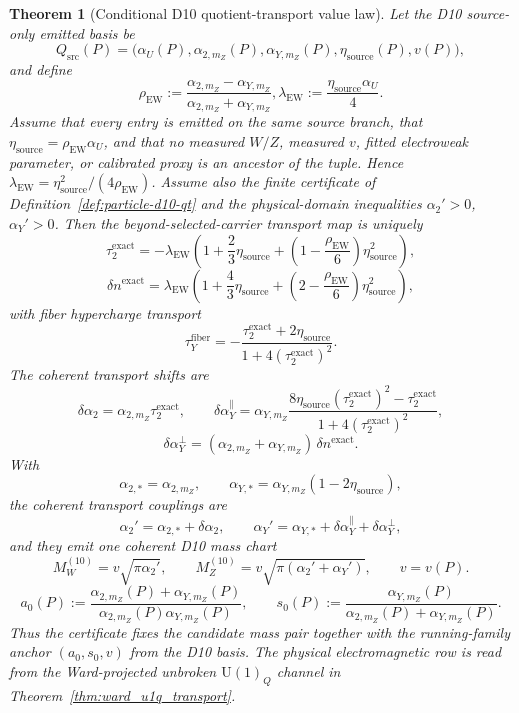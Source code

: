 \documentclass[11pt]{article}
\newtheorem{theorem}{Theorem}[section]
\newcommand{\U}{\mathrm{U}}
\begin{document}
\begin{theorem}[Conditional D10 quotient-transport value law]\label{thm:particle-conditional-d10-qt}
Let the D10 source-only emitted basis be
\[
Q_{\mathrm{src}}(P)=
\bigl(\alpha_U(P),\alpha_{2,m_Z}(P),\alpha_{Y,m_Z}(P),
\eta_{\mathrm{source}}(P),v(P)\bigr),
\]
and define
\[
\rho_{\mathrm{EW}}
:=
\frac{\alpha_{2,m_Z}-\alpha_{Y,m_Z}}{\alpha_{2,m_Z}+\alpha_{Y,m_Z}},
\lambda_{\mathrm{EW}}
:=
\frac{\eta_{\mathrm{source}}\alpha_U}{4}.
\]
Assume that every entry is emitted on the same source branch, that
\(\eta_{\mathrm{source}}=\rho_{\mathrm{EW}}\alpha_U\), and that no measured
\(W/Z\), measured \(v\), fitted electroweak parameter, or calibrated proxy is
an ancestor of the tuple.  Hence
\(\lambda_{\mathrm{EW}}=\eta_{\mathrm{source}}^2/(4\rho_{\mathrm{EW}})\).
Assume also the finite certificate of Definition~\ref{def:particle-d10-qt} and the
physical-domain inequalities
\(\alpha_2'>0\), \(\alpha_Y'>0\).
Then the beyond-selected-carrier transport map is uniquely
\[
\tau_2^{\mathrm{exact}}
=
-\lambda_{\mathrm{EW}}
\left(
1+\frac23\eta_{\mathrm{source}}
+
\left(1-\frac{\rho_{\mathrm{EW}}}{6}\right)\eta_{\mathrm{source}}^2
\right),
\]
\[
\delta n^{\mathrm{exact}}
=
\lambda_{\mathrm{EW}}
\left(
1+\frac43\eta_{\mathrm{source}}
+
\left(2-\frac{\rho_{\mathrm{EW}}}{6}\right)\eta_{\mathrm{source}}^2
\right),
\]
with fiber hypercharge transport
\[
\tau_Y^{\mathrm{fiber}}
=
-\frac{\tau_2^{\mathrm{exact}}+2\eta_{\mathrm{source}}}
{1+4(\tau_2^{\mathrm{exact}})^2}.
\]
The coherent transport shifts are
\[
\delta\alpha_2=\alpha_{2,m_Z}\tau_2^{\mathrm{exact}},
\qquad
\delta\alpha_Y^{\parallel}
=
\alpha_{Y,m_Z}
\frac{8\eta_{\mathrm{source}}(\tau_2^{\mathrm{exact}})^2-\tau_2^{\mathrm{exact}}}
{1+4(\tau_2^{\mathrm{exact}})^2},
\]
\[
\delta\alpha_Y^{\perp}
=
(\alpha_{2,m_Z}+\alpha_{Y,m_Z})\,\delta n^{\mathrm{exact}}.
\]
With
\[
\alpha_{2,*}=\alpha_{2,m_Z},
\qquad
\alpha_{Y,*}=\alpha_{Y,m_Z}(1-2\eta_{\mathrm{source}}),
\]
the coherent transport couplings are
\[
\alpha_2'=\alpha_{2,*}+\delta\alpha_2,
\qquad
\alpha_Y'=\alpha_{Y,*}+\delta\alpha_Y^{\parallel}+\delta\alpha_Y^{\perp},
\]
and they emit one coherent D10 mass chart
\[
M_W^{(10)}=v\sqrt{\pi\alpha_2'},
\qquad
M_Z^{(10)}=v\sqrt{\pi(\alpha_2'+\alpha_Y')},
\qquad
v=v(P).
\]
\[
a_0(P)
:=
\frac{\alpha_{2,m_Z}(P)+\alpha_{Y,m_Z}(P)}
{\alpha_{2,m_Z}(P)\alpha_{Y,m_Z}(P)},
\qquad
s_0(P)
:=
\frac{\alpha_{Y,m_Z}(P)}
{\alpha_{2,m_Z}(P)+\alpha_{Y,m_Z}(P)}.
\]
Thus the certificate fixes the candidate mass pair together with the
running-family anchor \((a_0,s_0,v)\) from the D10 basis. The physical electromagnetic row
is read from the Ward-projected unbroken \(\U(1)_Q\) channel in
Theorem~\ref{thm:ward_u1q_transport}.
\end{theorem}
\end{document}
